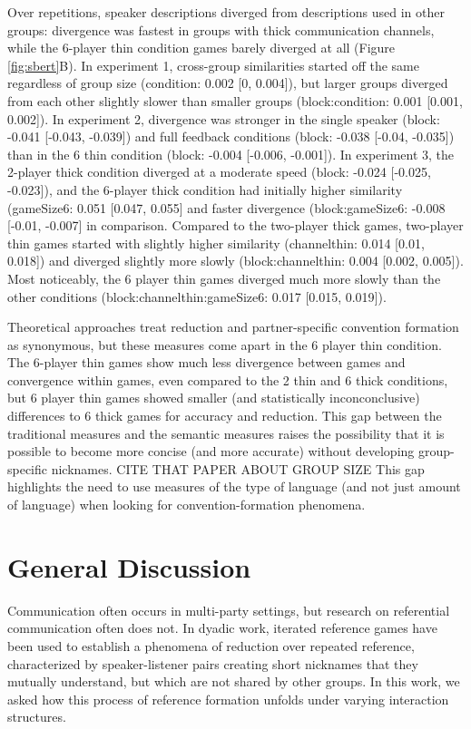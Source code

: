 \documentclass[
  english,
  a4paper,
]{article}
\begin{document}
Over repetitions, speaker descriptions diverged from descriptions used in other groups: divergence was fastest in groups with thick communication channels, while the 6-player thin condition games barely diverged at all (Figure \ref{fig:sbert}B). In experiment 1, cross-group similarities started off the same regardless of group size (condition: 0.002 {[}0, 0.004{]}), but larger groups diverged from each other slightly slower than smaller groups (block:condition: 0.001 {[}0.001, 0.002{]}). In experiment 2, divergence was stronger in the single speaker (block: -0.041 {[}-0.043, -0.039{]}) and full feedback conditions (block: -0.038 {[}-0.04, -0.035{]}) than in the 6 thin condition (block: -0.004 {[}-0.006, -0.001{]}). In experiment 3, the 2-player thick condition diverged at a moderate speed (block: -0.024 {[}-0.025, -0.023{]}), and the 6-player thick condition had initially higher similarity (gameSize6: 0.051 {[}0.047, 0.055{]} and faster divergence (block:gameSize6: -0.008 {[}-0.01, -0.007{]} in comparison. Compared to the two-player thick games, two-player thin games started with slightly higher similarity (channelthin: 0.014 {[}0.01, 0.018{]}) and diverged slightly more slowly (block:channelthin: 0.004 {[}0.002, 0.005{]}). Most noticeably, the 6 player thin games diverged much more slowly than the other conditions (block:channelthin:gameSize6: 0.017 {[}0.015, 0.019{]}).

Theoretical approaches treat reduction and partner-specific convention formation as synonymous, but these measures come apart in the 6 player thin condition. The 6-player thin games show much less divergence between games and convergence within games, even compared to the 2 thin and 6 thick conditions, but 6 player thin games showed smaller (and statistically inconconclusive) differences to 6 thick games for accuracy and reduction. This gap between the traditional measures and the semantic measures raises the possibility that it is possible to become more concise (and more accurate) without developing group-specific nicknames. CITE THAT PAPER ABOUT GROUP SIZE This gap highlights the need to use measures of the type of language (and not just amount of language) when looking for convention-formation phenomena.

\hypertarget{general-discussion}{%
\section{General Discussion}\label{general-discussion}}

Communication often occurs in multi-party settings, but research on referential communication often does not. In dyadic work, iterated reference games have been used to establish a phenomena of reduction over repeated reference, characterized by speaker-listener pairs creating short nicknames that they mutually understand, but which are not shared by other groups. In this work, we asked how this process of reference formation unfolds under varying interaction structures.
\end{document}
